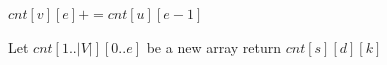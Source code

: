 \documentclass{book}
\begin{document}
\begin{enumerate}
\begin{enumerate}
\begin{itemize}
\begin{algorithm}[h!]
                        \begin{algorithmic}[1]
 	                            \State $cnt[v][e] += cnt[u][e - 1]$
                            \EndFunction
                        \end{algorithmic}                    
                        \begin{algorithmic}[1]
                            	\State Let $cnt[1..|V|][0..e]$ be a new array
                                \State {}
                                 
                                        \State {}
                                    \EndFor
                                \EndFor
                                \State return $cnt[s][d][k]$
                            \EndFunction
                        \end{algorithmic}
                    \end{algorithm}
                	\FloatBarrier				
				

\end{itemize}
\end{enumerate}
\end{enumerate}
\end{document}
